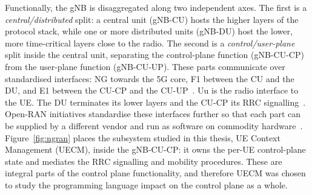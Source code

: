 \documentclass[english,oneside,a4paper,censored,csm,software-track-2020]{HYthesisML}
\begin{document}
Functionally, the gNB is disaggregated along two independent axes. The first is a
\emph{central/distributed} split: a central unit (gNB-CU) hosts the higher layers of the
protocol stack, while one or more distributed units (gNB-DU) host the lower, more
time-critical layers close to the radio. The second is a \emph{control/user-plane} split
inside the central unit, separating the control-plane function (gNB-CU-CP) from the
user-plane function (gNB-CU-UP). These parts communicate over standardised
interfaces: NG towards the 5G core, F1 between the CU and the DU, and E1 between the CU-CP and
the CU-UP~\cite{3gpp38401,3gpp38300,3gpp38463}. Uu is the radio interface to the UE. The DU
terminates its lower layers and the CU-CP its RRC signalling~\cite{3gpp38401,3gpp38300}.
Open-RAN initiatives standardise these interfaces
further so that each part can be supplied by a different vendor and run as software on
commodity hardware~\cite{polese2023oran}. Figure~\ref{fig:ngran} places the subsystem studied
in this thesis, UE Context Management (UECM), inside the gNB-CU-CP: it owns the per-UE
control-plane state and mediates the RRC signalling and mobility procedures.
These are integral parts of the control plane functionality, and therefore
UECM was chosen to study the programming language impact on the control plane
as a whole.
\end{document}

